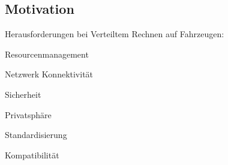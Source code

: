 
\subsection*{Motivation}
\begin{notes}
    \item Herausforderungen bei Verteiltem Rechnen auf Fahrzeugen:
    \begin{notes}
        \item Resourcenmanagement
        \item Netzwerk Konnektivität
        \item Sicherheit
        \item Privatsphäre
        \item Standardisierung
        \item Kompatibilität
    \end{notes}
\end{notes}

